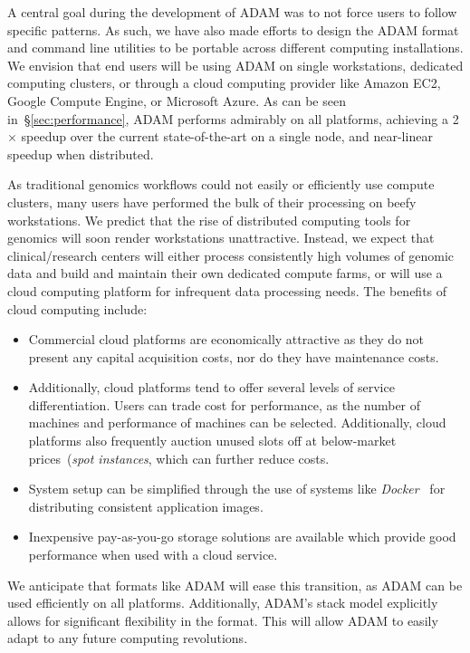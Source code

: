 \documentclass{bioinfo}
\begin{document}
A central goal during the development of ADAM was to not force users to follow specific patterns. As such, we have also made efforts to design the ADAM format and command
line utilities to be portable across different computing installations. We envision that end users will be using ADAM on single workstations, dedicated computing
clusters, or through a cloud computing provider like Amazon EC2, Google Compute Engine, or Microsoft Azure. As can be seen in~\S\ref{sec:performance}, ADAM performs
admirably on all platforms, achieving a 2$\times$ speedup over the current state-of-the-art on a single node, and near-linear speedup when distributed.

As traditional genomics workflows could not easily or efficiently use compute clusters, many users have performed the bulk of their processing on beefy workstations. We predict
that the rise of distributed computing tools for genomics will soon render workstations unattractive. Instead, we expect that clinical/research centers will either process
consistently high volumes of genomic data and build and maintain their own dedicated compute farms, or will use a cloud computing platform for infrequent data processing
needs. The benefits of cloud computing include:

\begin{itemize}
\item Commercial cloud platforms are economically attractive as they do not present any capital acquisition costs, nor do they have maintenance costs.
\item Additionally, cloud platforms tend to offer several levels of service differentiation. Users can trade cost for performance, as the number of machines and performance of
machines can be selected. Additionally, cloud platforms also frequently auction unused slots off at below-market prices~(\emph{spot instances}, which can further reduce costs.
\item System setup can be simplified through the use of systems like \textit{Docker}~\citep{docker} for distributing consistent application images.
\item Inexpensive pay-as-you-go storage solutions are available which provide good performance when used with a cloud service.
\end{itemize}

We anticipate that formats like ADAM will ease this transition, as ADAM can be used efficiently on all platforms. Additionally, ADAM's stack model explicitly allows for significant
flexibility in the format. This will allow ADAM to easily adapt to any future computing revolutions.
\end{document}
